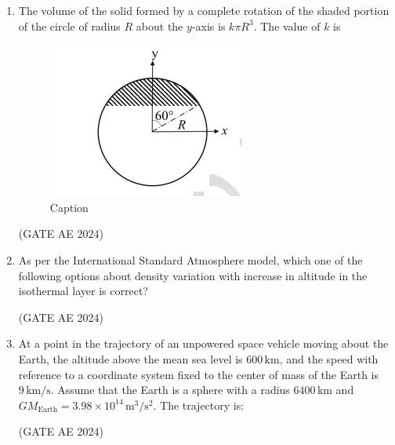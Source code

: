 \documentclass[journal,12pt,onecolumn]{IEEEtran}
\theoremstyle{remark}
\begin{document}
\begin{enumerate}
\item The volume of the solid formed by a complete rotation of the shaded portion of the circle of radius $R$ about the $y$-axis is $k\pi R^3$. The value of $k$ is  
\begin{figure}[H]
    \centering
    \includegraphics[width=0.5\columnwidth]{figs/Screenshot 2025-08-24 055943.png}
    \caption{Caption}
    \label{fig:placeholder}
\end{figure}
\begin{enumerate}
\end{enumerate}
\hfill(GATE AE 2024)

\item As per the International Standard Atmosphere model, which one of the following options about density variation with increase in altitude in the isothermal layer is correct?  
\begin{enumerate}
\end{enumerate}
\hfill(GATE AE 2024)


\item At a point in the trajectory of an unpowered space vehicle moving about the Earth, the altitude above the mean sea level is $600 \, \text{km}$, and the speed with reference to a coordinate system fixed to the center of mass of the Earth is $9 \, \text{km/s}$. Assume that the Earth is a sphere with a radius $6400 \, \text{km}$ and $GM_{\text{Earth}} = 3.98 \times 10^{14} \, \text{m}^3/\text{s}^2$. The trajectory is: 
\begin{enumerate}
\end{enumerate}
\hfill(GATE AE 2024)


\end{enumerate}
\end{document}

